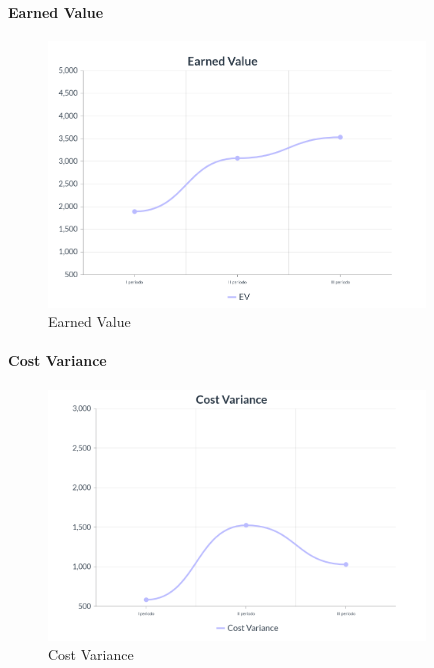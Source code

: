\paragraph{Earned Value}
\begin{center}
\begin{figure}[H]
  \centering
  \renewcommand{\thefigure}{3}
  \includegraphics[width=10cm]{./res/images/EVGraph.png}
  \caption{Earned Value}
  \label{fig:Grafico Earned Value}
\end{figure}
\end{center}
\pagebreak
\paragraph{Cost Variance}
\begin{center}
\begin{figure}[H]
  \centering
  \renewcommand{\thefigure}{4}
  \includegraphics[width=10cm]{./res/images/CVGraph.png}
  \caption{Cost Variance}
  \label{fig:Grafico Cost Variance}
\end{figure}
\end{center}

